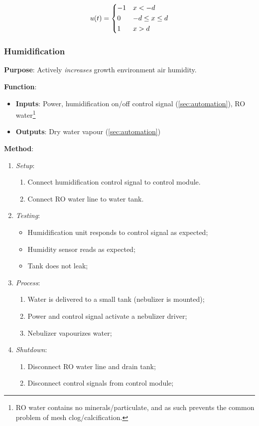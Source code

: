\begin{gather}
    \label{eqn:bangbang}
    u(t)=\begin{dcases}
        -1  &   x < -d \\
        0   &   -d \leq x \leq d \\
        1   &   x > d \\
    \end{dcases}
\end{gather}

\clearpage

\subsubsection{Humidification}
\label{sec:humidification}

\textbf{Purpose}: Actively \textit{increases} growth environment air humidity.

\textbf{Function}:
\begin{itemize}
    \item \textbf{Inputs}: Power, humidification on/off control signal (\ref{sec:automation}), RO water\footnote{RO water contains no minerals/particulate, and as such prevents the common problem of mesh clog/calcification.}
    \item \textbf{Outputs}: Dry water vapour (\ref{sec:automation})
\end{itemize}

\textbf{Method}:
\begin{enumerate}
    \item \textit{Setup}:
    \begin{enumerate}
        \item Connect humidification control signal to control module.
        \item Connect RO water line to water tank.
    \end{enumerate}
    \item \textit{Testing}:
    \begin{itemize}
        \item Humidification unit responds to control signal as expected;
        \item Humidity sensor reads as expected;
        \item Tank does not leak;
    \end{itemize}
    \item \textit{Process}:
    \begin{enumerate}
        \item Water is delivered to a small tank (nebulizer is mounted);
        \item Power and control signal activate a nebulizer driver;
        \item Nebulizer vapourizes water;
    \end{enumerate}
    \item \textit{Shutdown}:
    \begin{enumerate}
        \item Disconnect RO water line and drain tank;
        \item Disconnect control signals from control module;
    \end{enumerate}
\end{enumerate}

